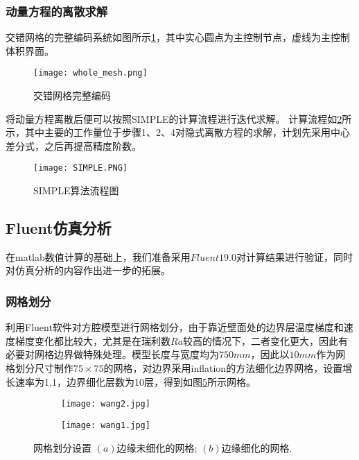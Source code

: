 \documentclass[UTF8]{article} %
\begin{document}
\subsubsection{动量方程的离散求解}
交错网格的完整编码系统如图所示\ref{fig:meshgrid}，其中实心圆点为主控制节点，虚线为主控制体积界面。
\begin{figure}[H]
  \centering
  \texttt{[image: whole\_mesh.png]}
  \caption{交错网格完整编码}
  \label{fig:meshgrid}
\end{figure}
将动量方程离散后便可以按照SIMPLE的计算流程进行迭代求解。
计算流程如\ref{fig:SIMPLEflowchart}所示，其中主要的工作量位于步骤1、2、4对隐式离散方程的求解，计划先采用中心差分式，之后再提高精度阶数。
\begin{figure}[H]
  \centering
  \texttt{[image: SIMPLE.PNG]}
  \caption{SIMPLE算法流程图}
  \label{fig:SIMPLEflowchart}
\end{figure}

\subsection{Fluent仿真分析}
在matlab数值计算的基础上，我们准备采用$Fluent19.0$对计算结果进行验证，同时对仿真分析的内容作出进一步的拓展。
\subsubsection{网格划分}
利用Fluent软件对方腔模型进行网格划分，由于靠近壁面处的边界层温度梯度和速度梯度变化都比较大，尤其是在瑞利数$Ra$较高的情况下，二者变化更大，因此有必要对网格边界做特殊处理。模型长度与宽度均为$750mm$，因此以$10mm$作为网格划分尺寸制作$75 \times 75$的网格，对边界采用inflation的方法细化边界网格，设置增长速率为1.1，边界细化层数为10层，得到如图\ref{wg}所示网格。
 
\begin{figure}[H]
  \centering
  \begin{subfigure}[b]{0.39\textwidth}
         \centering
         \texttt{[image: wang2.jpg]}
          \caption{}
          \label{f4}
  \end{subfigure}
  \quad
  \begin{subfigure}[b]{0.4\textwidth}
          \centering
          \texttt{[image: wang1.jpg]}
          \caption{}
          \label{f5}
  \end{subfigure}
  \caption{网格划分设置 $(a)$边缘未细化的网格; $(b)$边缘细化的网格.}
  \label{wg}
\end{figure}
\end{document}
